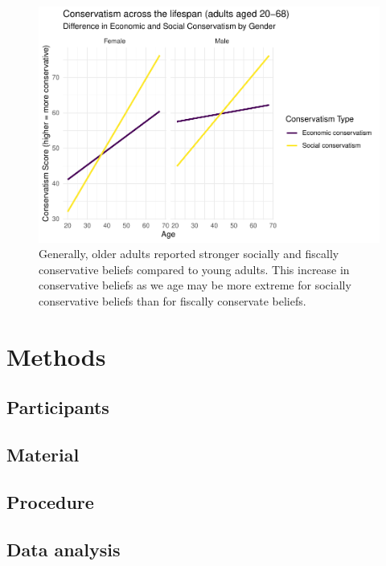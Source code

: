 \documentclass[man]{apa6}
\begin{document}
\begin{figure}
\centering
\includegraphics{manuscript_files/figure-latex/figure2-1.pdf}
\caption{\label{fig:figure2}Generally, older adults reported stronger
socially and fiscally conservative beliefs compared to young adults.
This increase in conservative beliefs as we age may be more extreme for
socially conservative beliefs than for fiscally conservate beliefs.}
\end{figure}

\section{Methods}\label{methods}

\subsection{Participants}\label{participants}

\subsection{Material}\label{material}

\subsection{Procedure}\label{procedure}

\subsection{Data analysis}\label{data-analysis}
\end{document}
